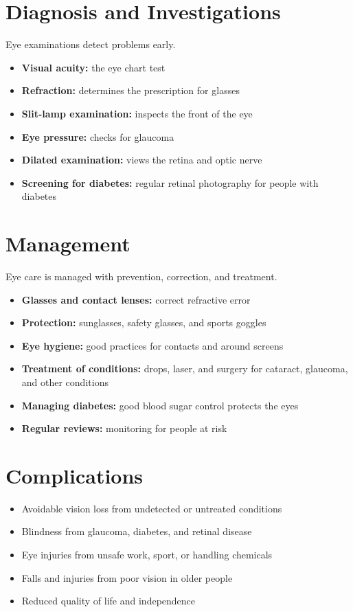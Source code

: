 \section*{Diagnosis and Investigations}
Eye examinations detect problems early.
\begin{itemize}
    \item \textbf{Visual acuity:} the eye chart test
    \item \textbf{Refraction:} determines the prescription for glasses
    \item \textbf{Slit-lamp examination:} inspects the front of the eye
    \item \textbf{Eye pressure:} checks for glaucoma
    \item \textbf{Dilated examination:} views the retina and optic nerve
    \item \textbf{Screening for diabetes:} regular retinal photography for people with diabetes
\end{itemize}

\section*{Management}
Eye care is managed with prevention, correction, and treatment.
\begin{itemize}
    \item \textbf{Glasses and contact lenses:} correct refractive error
    \item \textbf{Protection:} sunglasses, safety glasses, and sports goggles
    \item \textbf{Eye hygiene:} good practices for contacts and around screens
    \item \textbf{Treatment of conditions:} drops, laser, and surgery for cataract, glaucoma, and other conditions
    \item \textbf{Managing diabetes:} good blood sugar control protects the eyes
    \item \textbf{Regular reviews:} monitoring for people at risk
\end{itemize}

\section*{Complications}
\begin{itemize}
    \item Avoidable vision loss from undetected or untreated conditions
    \item Blindness from glaucoma, diabetes, and retinal disease
    \item Eye injuries from unsafe work, sport, or handling chemicals
    \item Falls and injuries from poor vision in older people
    \item Reduced quality of life and independence
\end{itemize}

